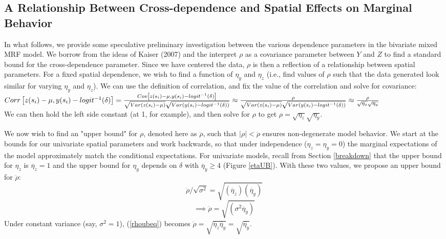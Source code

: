 \documentclass[12pt, a4paper, twoside]{article}
\begin{document}
\subsection{A Relationship Between Cross-dependence and Spatial Effects on Marginal Behavior} \label{specUB}
In what follows, we provide some speculative preliminary investigation between the various dependence parameters in the bivariate mixed MRF model. We borrow from the ideas of Kaiser (2007) and the interpret $\rho$ as a covariance parameter between $Y$ and $Z$ to find a standard bound for the cross-dependence parameter. Since we have centered the data, $\rho$ is then a reflection of a relationship between spatial parameters. For a fixed spatial dependence, we wish to find a function of $\eta_y$ and $\eta_z$ (i.e., find values of $\rho$ such that the data generated look similar for varying $\eta_y$ and $\eta_z$). We can use the definition of correlation, and fix the value of the correlation and solve for covariance:\\
\begin{math}
Corr\left[z(s_i)-\mu, y(s_i)-logit^{-1}(\delta)\right] = \frac{Cov\left[z(s_i)-\mu ,  y(s_i)-logit^{-1}(\delta)\right]}{\sqrt{Var(z(s_i)-\mu)}\sqrt{Var(y(s_i)-logit^{-1}(\delta))}}\\
\approx \frac{\rho}{\sqrt{Var(z(s_i)-\mu)}\sqrt{Var(y(s_i)-logit^{-1}(\delta))}}\\
\approx \frac{\rho}{\sqrt{\eta_z}\sqrt{\eta_y}}
\end{math}\\
We can then hold the left side constant (at 1, for example), and then solve for $\rho$ to get $\rho = \sqrt{\eta_z}\sqrt{\eta_y}$.

We now wish to find an "upper bound" for $\rho$, denoted here as $\ddot{\rho}$, such that $\lvert\rho\rvert < \ddot{\rho}$ ensures non-degenerate model behavior. We start at the bounds for our univariate spatial parameters and work backwards, so that under independence  ($\eta_z = \eta_y = 0$) the marginal expectations of the model approximately match the conditional expectations. For univariate models, recall from Section \ref{breakdown} that the upper bound for $\eta_z$ is $\ddot{\eta_z}=1$ and the upper bound for $\eta_y$ depends on $\delta$ with $\ddot{\eta_y}\geq4$ (Figure \ref{etaUB}). With these two values, we propose an upper bound for $\ddot{\rho}$:
\begin{equation*}
\ddot{\rho}/\sqrt{\sigma^2} = \sqrt{(\ddot{\eta_z})(\ddot{\eta_y})}
\end{equation*}
\begin{equation} \label{rhoubeq}
\implies \ddot{\rho} = \sqrt{(\sigma^2\ddot{\eta_y})}
\end{equation}
Under constant variance (say, $\sigma^2=1$), (\ref{rhoubeq}) becomes $\ddot{\rho}=\sqrt{\ddot{\eta_z}\ddot{\eta_y}} = \sqrt{\ddot{\eta_y}}$.
\end{document}
